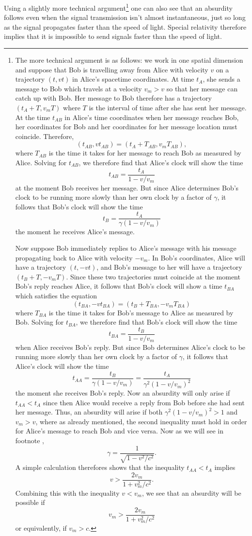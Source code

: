 Using a slightly more technical argument\footnote{The more technical argument is as follows: we work in one spatial dimension and suppose that Bob is travelling away from Alice with velocity $v$ on a trajectory $(t, vt)$  in Alice's spacetime coordinates. At time $t_A$, she sends a message to Bob which travels at a velocity $v_m>v$ so that her message can catch up with Bob. Her message to Bob therefore has a trajectory $(t_A+T,v_m T)$ where $T$ is the interval of time after she has sent her message. At the time $t_{AB}$ in Alice's time coordinates when her message reaches Bob, her coordinates for Bob and her coordinates for her message location must coincide. Therefore, 
$$(t_{AB}, v t_{AB})=(t_A +T_{AB}, v_m T_{AB}),$$
where $T_{AB}$ is the time it takes for her message to reach Bob as measured by Alice. Solving for $t_{AB}$, we therefore find that Alice's clock will show the time $$t_{AB}=\frac{t_A}{1-v/v_m}$$ at the moment Bob receives her message. But since Alice determines Bob's clock to be running more slowly than her own clock by a factor of $\gamma$, it follows that Bob's clock will show the time  
$$t_B=\frac{t_A}{\gamma(1-v/v_m)}$$ the moment he receives Alice's message. 


Now suppose Bob immediately replies to Alice's message with his message propagating back to Alice with velocity $-v_m$. In Bob's coordinates, Alice will have a trajectory $(t,-vt)$, and Bob's message to her will have a trajectory $(t_B+T, -v_m T)$. Since these two trajectories must coincide at the moment Bob's reply reaches Alice, it follows that Bob's clock will show a time $t_{BA}$ which satisfies the equation
$$(t_{BA}, -v t_{BA})=(t_B+T_{BA}, -v_m T_{BA})$$
where $T_{BA}$ is the time it takes for Bob's message to Alice as measured by Bob. Solving for $t_{BA}$, we therefore find that Bob's clock will show the time
$$t_{BA}=\frac{t_B}{1-v/v_m}$$
when Alice receives Bob's reply. But since Bob determines Alice's clock to be running more slowly than her own clock by a factor of $\gamma$, it follows that Alice's clock will show the time  
$$t_{AA}=\frac{t_B}{\gamma(1-v/v_m)}=\frac{t_A}{\gamma^2(1-v/v_m)^2}$$ the moment she receives Bob's reply. Now an absurdity will only arise if $t_{AA}<t_A$ since then Alice would receive a reply from Bob before she had sent her message. Thus, an absurdity will arise if both $\gamma^2(1-v/v_m)^2>1$ and $v_m> v$, where as already mentioned, the second inequality must hold in order for Alice's message to reach Bob and vice versa. Now as we will see in footnote , $$\gamma=\frac{1}{\sqrt{1-v^2/c^2}}.$$ A simple calculation therefores shows that the inequality $t_{AA}<t_A$ implies
\begin{equation*}\label{absurdinequality}
v>\frac{2v_m}{1+v_m^2/c^2}.
\end{equation*}
Combining this with the inequality $v<v_m$, we see that an absurdity will be possible if 
$$ v_m>\frac{2v_m}{1+v_m^2/c^2}$$
or equivalently, if $v_m>c$.} 
one can also see that an absurdity follows even when the signal transmission isn't almost instantaneous, just so long as the signal propagates faster than the speed of light. Special relativity therefore implies that it is impossible to send signals faster than the speed of light.

